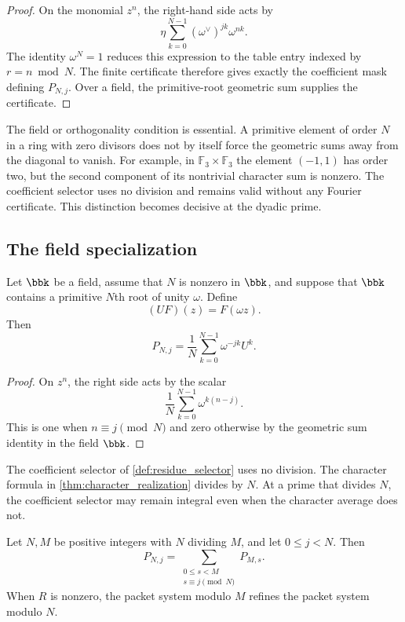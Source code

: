 \begin{proof}
On the monomial $z^n$, the right-hand side acts by
\[
\eta\sum_{k=0}^{N-1}(\omega^\vee)^{jk}\omega^{nk}.
\]
The identity $\omega^N=1$ reduces this expression to the table entry indexed
by $r=n\bmod N$. The finite certificate therefore gives exactly the
coefficient mask defining $P_{N,j}$.
Over a field, the primitive-root geometric sum supplies the certificate.
\end{proof}

The field or orthogonality condition is essential. A primitive element of
order $N$ in a ring with zero divisors does not by itself force the geometric
sums away from the diagonal to vanish. For example, in $\mathbb F_3\times\mathbb F_3$ the
element $(-1,1)$ has order two, but the second component of its nontrivial
character sum is nonzero. The coefficient selector uses no division and remains valid
without any Fourier certificate. This distinction becomes decisive at the
dyadic prime.


\subsection{The field specialization}
\begin{theorem}\label{thm:character_realization}
Let $\bbk$ be a field, assume that $N$ is nonzero in $\bbk$, and suppose that $\bbk$ contains a primitive $N$th root of unity $\omega$.  Define
\[
(UF)(z)=F(\omega z).
\]
Then
\[
P_{N,j}
=
\frac1N\sum_{k=0}^{N-1}\omega^{-jk}U^k.
\]
\end{theorem}

\begin{proof}
On $z^n$, the right side acts by the scalar
\[
\frac1N\sum_{k=0}^{N-1}\omega^{k(n-j)}.
\]
This is one when $n\equiv j\pmod N$ and zero otherwise by the geometric sum identity in the field $\bbk$.
\end{proof}

\begin{remark}\label{rem:selector_character}
The coefficient selector of \cref{def:residue_selector} uses no division.  The character formula in \cref{thm:character_realization} divides by $N$.  At a prime that divides $N$, the coefficient selector may remain integral even when the character average does not.
\end{remark}

\begin{theorem}\label{thm:residue_refinement}\label{thm:polyphase-refinement}
Let $N,M$ be positive integers with $N$ dividing $M$, and let $0\leq j<N$.  Then
\[
P_{N,j}
=
\sum_{\substack{0\leq s<M\\s\equiv j\pmod N}}P_{M,s}.
\]
When $R$ is nonzero, the packet system modulo $M$ refines the packet system modulo $N$.
\end{theorem}

